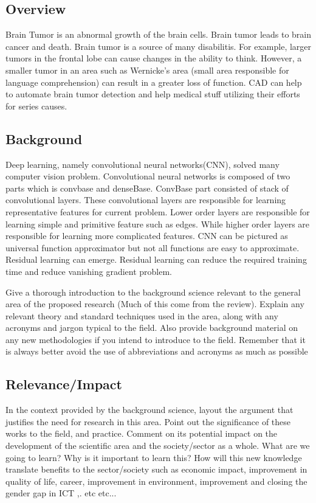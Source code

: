 \documentclass{article}
\begin{document}
\subsection{Overview}
Brain Tumor is an abnormal growth of the brain cells\cite{deangelis2001brain}. Brain tumor leads to brain cancer and death\cite{deangelis2001brain}. Brain tumor is a source of many disabilitis. For example, larger tumors in the frontal lobe can cause changes in the ability to think. However, a smaller tumor in an area such as Wernicke's area (small area responsible for language comprehension) can result in a greater loss of function. CAD can help to automate brain tumor detection and help medical stuff utilizing their efforts for series causes.

\subsection{Background}

Deep learning\cite{lecun2015deep}, namely convolutional neural networks(CNN)\cite{lecun1989handwritten}, solved many computer vision problem. Convolutional neural networks is composed of two parts which is convbase and denseBase. ConvBase part consisted of stack of convolutional layers. These convolutional layers are responsible for learning representative features for current problem. Lower order layers are responsible for learning simple and primitive feature such as edges. While higher order layers are responsible for learning more complicated features. CNN can be pictured as universal function approximator but not all functions are easy to approximate. Residual learning\cite{he2016deep} can emerge. Residual learning can  reduce the required training time and reduce vanishing gradient problem.


Give a thorough introduction to the background science relevant to the general area of the proposed research (Much of this come from the review). Explain any relevant theory and standard techniques used in the area, along with any acronyms and jargon typical to the field. Also provide background material on any new methodologies if you intend to introduce to the field. Remember that it is always better avoid the use of abbreviations and acronyms as much as possible

\subsection{Relevance/Impact}

In the context provided by the background science, layout the argument that justifies the need for research in this area. Point out the significance of these works to the field, and practice. Comment on its potential impact on the development of the scientific area and the society/sector as a whole. What are we going to learn? Why is it important to learn this? How will this new knowledge translate benefits to the sector/society such as economic impact, improvement in quality of life, career, improvement in environment, improvement and closing the gender gap in ICT ,. etc etc...
\end{document}
